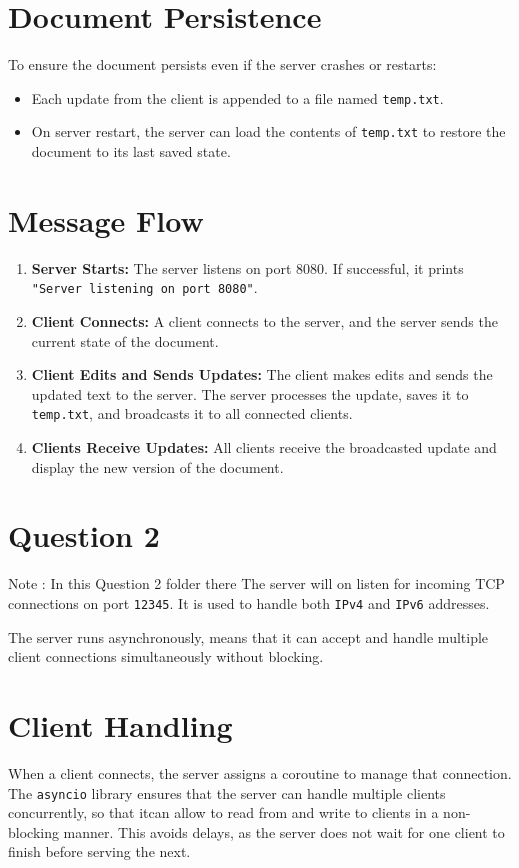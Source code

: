\documentclass{exam}
\begin{document}
\section*{Document Persistence}
To ensure the document persists even if the server crashes or restarts:
\begin{itemize}
    \item Each update from the client is appended to a file named \texttt{temp.txt}.
    \item On server restart, the server can load the contents of \texttt{temp.txt} to restore the document to its last saved state.
\end{itemize}

\section*{Message Flow}
\begin{enumerate}
    \item \textbf{Server Starts:} The server listens on port 8080. If successful, it prints \texttt{"Server listening on port 8080"}.
    \item \textbf{Client Connects:} A client connects to the server, and the server sends the current state of the document.
    \item \textbf{Client Edits and Sends Updates:} The client makes edits and sends the updated text to the server. The server processes the update, saves it to \texttt{temp.txt}, and broadcasts it to all connected clients.
    \item \textbf{Clients Receive Updates:} All clients receive the broadcasted update and display the new version of the document.
\end{enumerate}
\newpage


\section*{ Question 2}

Note : In this  Question 2 folder there 
The server will on listen for incoming TCP connections on port \texttt{12345}. 
It is used to handle both \texttt{IPv4} and \texttt{IPv6} addresses. 

The server runs asynchronously, means that  it can accept and handle multiple client connections simultaneously without blocking.

\section*{Client Handling}
When a client connects, the server assigns a coroutine to manage that connection.
The \texttt{asyncio} library ensures that the server can handle multiple clients concurrently, so that itcan allow  to read from and write to clients in a non-blocking manner. 
This avoids delays, as the server does not wait for one client to finish before serving the next.
\end{document}
